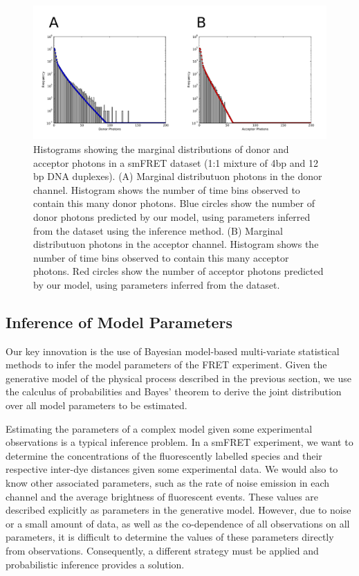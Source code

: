 \begin{figure}
   \begin{center}
      \includegraphics*[width=6in]{inference/marginal_distributions.pdf}
      \caption{Histograms showing the marginal distributions of donor and acceptor photons in a smFRET dataset (1:1 mixture of 4bp and 12 bp DNA duplexes). (A) Marginal distributuon photons in the donor channel. Histogram shows the number of time bins observed to contain this many donor photons. Blue circles show the number of donor photons predicted by our model, using parameters inferred from the dataset using the inference method. (B) Marginal distributuon photons in the acceptor channel. Histogram shows the number of time bins observed to contain this many acceptor photons. Red circles show the number of acceptor photons predicted by our model, using parameters inferred from the dataset.}
      \label{fig:marginals}
   \end{center}
\end{figure}

\clearpage

\subsection{Inference of Model Parameters}
Our key innovation is the use of Bayesian model-based multi-variate statistical methods to infer the model parameters of the FRET experiment. Given the generative model of the physical process described in the previous section, we use the calculus of probabilities and Bayes' theorem to derive the joint distribution over all model parameters to be estimated.

Estimating the parameters of a complex model given some experimental observations is a typical inference problem. In a smFRET experiment, we want to determine the concentrations of the fluorescently labelled species and their respective inter-dye distances given some experimental data. We would also to know other associated parameters, such as the rate of noise emission in each channel and the average brightness of fluorescent events. These values are described explicitly as parameters in the generative model. However, due to noise or a small amount of data, as well as the co-dependence of all observations on all parameters, it is difficult to determine the values of these parameters directly from observations. Consequently, a different strategy must be applied and probabilistic inference provides a solution.

